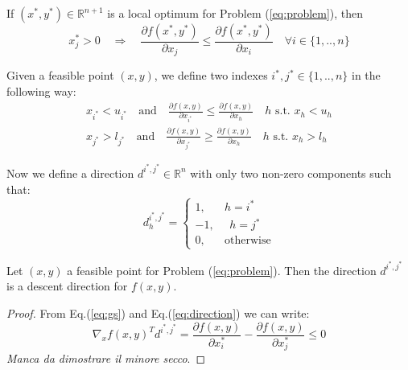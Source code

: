 \begin{corollary}
If $(x^*, y^*) \in \mathbb{R}^{n+1}$ is a local optimum for Problem (\ref{eq:problem}), then
\begin{equation}
x_j^* > 0 \quad \Rightarrow \quad \frac{\partial f(x^*, y^*)}{\partial x_j} \leq \frac{\partial f(x^*, y^*)}{\partial x_i} \quad \forall i \in \{1, .., n\}
\end{equation}
\end{corollary}
Given a feasible point $(x,y)$, we define two indexes $i^*, j^* \in \{1, .., n\}$ in the following way:
\begin{subequations}\label{eq:gs}
\begin{align}
x_{i^*} < u_{i^*} \quad \text{and} \quad  \frac{\partial f(x,y)}{\partial x_{i^*}}\leq \frac{\partial f(x,y)}{\partial x_h} \quad h \text{ s.t. } x_h < u_h \\
x_{j^*} > l_{j^*} \quad \text{and} \quad  \frac{\partial f(x,y)}{\partial x_{j^*}}\geq \frac{\partial f(x,y)}{\partial x_h} \quad h \text{ s.t. } x_h > l_h 
\end{align}
\end{subequations}

\hspace{-1.8em} Now we define a direction $d^{i^*,j^*} \in \mathbb{R}^n$ with only two non-zero components such that:
\begin{equation}\label{eq:direction}
d^{i^*,j^*}_h = 
\begin{cases}
1, \quad \text{    } h=i^*\\
-1, \text{    } \text{    } h=j^*\\
0, \quad \text{    } \text{otherwise}
\end{cases}
\end{equation}

\begin{proposition}
Let $(x,y)$ a feasible point for Problem (\ref{eq:problem}). Then the direction $d^{i^*,j^*}$ is a descent direction for $f(x,y)$.
\end{proposition}
\begin{proof}
From Eq.(\ref{eq:gs}) and Eq.(\ref{eq:direction}) we can write:
\begin{equation}
\nabla_x f(x,y)^T d^{i^*,j^*} = \frac{\partial f(x, y)}{\partial x_i^*} - \frac{\partial f(x, y)}{\partial x_j^*} \leq 0
\end{equation}
\textit{Manca da dimostrare il minore secco}.
\end{proof}

